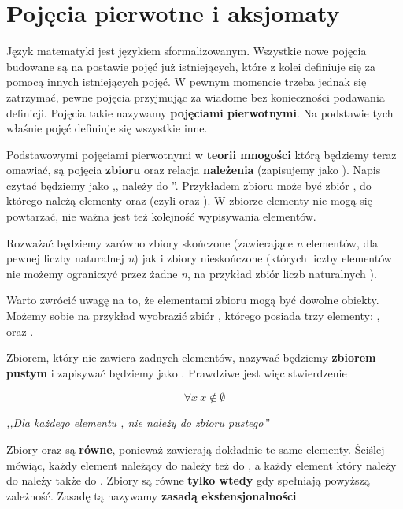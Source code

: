 \section{Pojęcia pierwotne i aksjomaty}

Język matematyki jest językiem sformalizowanym. Wszystkie nowe pojęcia budowane są na postawie pojęć już istniejących, które z kolei definiuje się za pomocą innych istniejących pojęć. W pewnym momencie trzeba jednak się zatrzymać, pewne pojęcia przyjmując za wiadome bez konieczności podawania definicji. Pojęcia takie nazywamy \textbf{pojęciami pierwotnymi}. Na podstawie tych właśnie pojęć definiuje się wszystkie inne. 

Podstawowymi pojęciami pierwotnymi w \textbf{teorii mnogości} którą będziemy teraz omawiać, są pojęcia \textbf{zbioru} oraz relacja \textbf{należenia} (zapisujemy jako \m{\in}). Napis  czytać będziemy jako ,, należy do ''. Przykładem zbioru może być zbiór , do którego należą elementy  oraz  (czyli  oraz ). W zbiorze elementy nie mogą się powtarzać, nie ważna jest też kolejność wypisywania elementów.

Rozważać będziemy zarówno zbiory skończone (zawierające \textit{n} elementów, dla pewnej liczby naturalnej \textit{n}) jak i zbiory nieskończone (których liczby elementów nie możemy ograniczyć przez żadne \textit{n}, na przykład zbiór liczb naturalnych ).

Warto zwrócić uwagę na to, że elementami zbioru mogą być dowolne obiekty. Możemy sobie na przykład wyobrazić zbiór , którego posiada trzy elementy: ,  oraz .

Zbiorem, który nie zawiera żadnych elementów, nazywać będziemy \textbf{zbiorem pustym} i zapisywać będziemy jako \m{ \emptyset }. Prawdziwe jest więc stwierdzenie

\[ 
\forall{x}\ x \not\in \emptyset 
\]
\begin{center}
    \textit{,,Dla każdego elementu ,  nie należy do zbioru pustego''}
\end{center}

Zbiory  oraz  są \textbf{równe}, ponieważ zawierają dokładnie te same elementy. Ściślej mówiąc, każdy element należący do  należy też do , a każdy element który należy do  należy także do . Zbiory są równe \textbf{tylko wtedy} gdy spełniają powyższą zależność. Zasadę tą nazywamy \textbf{zasadą ekstensjonalności}

